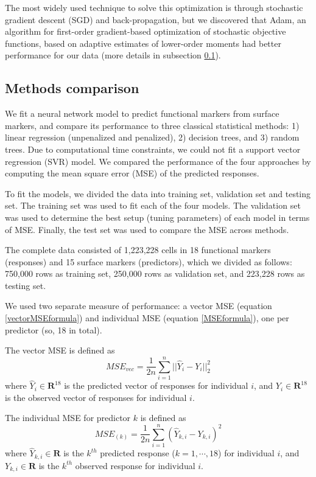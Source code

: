\documentclass[graybox]{svmult}
\begin{document}
The most widely used technique to solve this optimization is through
stochastic gradient descent (SGD) and back-propagation, but we
discovered that Adam\cite{Kingma2014}, an algorithm for first-order
gradient-based optimization of stochastic objective functions, based
on adaptive estimates of lower-order moments had better performance
for our data (more details in subsection \ref{comparison}).


\subsection{Methods comparison}
\label{comparison}

We fit a neural network model to predict functional markers from
surface markers, and compare its performance to three classical
statistical methods: 1) linear regression (unpenalized and penalized),
2) decision trees, and 3) random trees. Due to computational time
constraints, we could not fit a support vector regression (SVR)
model. We compared the performance of the four approaches by computing
the mean square error (MSE) of the predicted responses.

To fit the models, we divided the data into training set, validation
set and testing set. The training set was used to fit each of the four
models. The validation set was used to determine the best setup
(tuning parameters) of each model in terms of MSE. Finally, the test
set was used to compare the MSE across methods.

The complete data consisted of 1,223,228 cells in 18 functional
markers (responses) and 15 surface markers (predictors), which we
divided as follows: 750,000 rows as training set, 250,000 rows as
validation set, and 223,228 rows as testing set.

We used two separate measure of performance: a vector MSE (equation
\ref{vectorMSEformula}) and individual MSE (equation
\ref{MSEformula}), one per predictor (so, 18 in total).

The vector MSE is defined as
\begin{equation}
MSE_{vec} = \frac{1}{2n} \sum_{i=1}^n ||\hat{Y}_i - Y_i ||^2_2
\label{vectorMSEformula}
\end{equation}
where $\hat{Y}_i \in \mathbf{R}^{18}$ is the predicted vector of
responses for individual $i$, and $Y_i \in \mathbf{R}^{18}$ is the
observed vector of responses for individual $i$.

The individual MSE for predictor $k$ is defined  as
\begin{equation}
MSE_{(k)} = \frac{1}{2n} \sum_{i=1}^n (\hat{Y}_{k,i} - Y_{k,i} )^2
\label{MSEformula}
\end{equation}
where $\hat{Y}_{k,i} \in \mathbf{R}$ is the $k^{th}$ predicted
response ($k=1,\cdots,18$) for individual $i$, and $Y_{k,i} \in
\mathbf{R}$ is the $k^{th}$ observed response for individual $i$.
\end{document}
